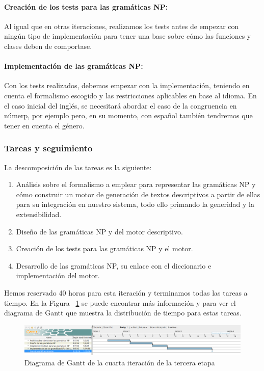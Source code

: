 \paragraph{Creación de los tests para las gramáticas NP:} Al igual que en otras iteraciones, realizamos los tests antes de empezar con ningún tipo de implementación para tener una base sobre cómo las funciones y clases deben de comportase.

\paragraph{Implementación de las gramáticas NP:} Con los tests realizados, debemos empezar con la implementación, teniendo en cuenta el formalismo escogido y las restricciones aplicables en base al idioma. En el caso inicial del inglés, se necesitará abordar el caso de la congruencia en númerp, por ejemplo pero, en su momento, con español también tendremos que tener en cuenta el género.

\subsubsection{Tareas y seguimiento}

La descomposición de las tareas es la siguiente:

\begin{enumerate}[label=\bfseries WBS 4.\arabic*]
  \item Análisis sobre el formalismo a emplear para representar las gramáticas NP y cómo construir un motor de generación de textos descriptivos a partir de ellas para su integración en nuestro sistema, todo ello primando la generidad y la extensibilidad.
  \item Diseño de las gramáticas NP y del motor descriptivo.
  \item Creación de los tests para las gramáticas NP y el motor.
  \item Desarrollo de las gramáticas NP, su enlace con el diccionario e implementación del motor.
\end{enumerate}

\noindent Hemos reservado 40 horas para esta iteración y terminamos todas las tareas a tiempo. En la Figura ~\ref{fig:sec3it4} se puede encontrar más información y para ver el diagrama de Gantt que muestra la distribución de tiempo para estas tareas.

\begin{figure}
    \includegraphics[width=\textwidth,height=\textheight,keepaspectratio]{./img/sec3it4.png}
  \caption{Diagrama de Gantt de la cuarta iteración de la tercera etapa}
  \label{fig:sec3it4}
\end{figure}

